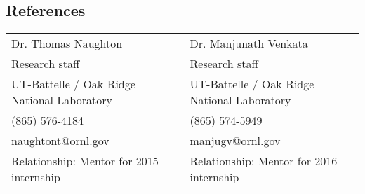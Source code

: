 \documentclass[10pt]{res}
\begin{document}
\begin{resume}
\section{References}
\vspace{2mm}
\begin{tabularx}{\textwidth}{X X}
Dr. Thomas Naughton  & Dr. Manjunath Venkata \\
Research staff & Research staff \\
UT-Battelle / Oak Ridge National Laboratory & UT-Battelle / Oak Ridge National Laboratory \\
(865) 576-4184 & (865) 574-5949 \\
naughtont@ornl.gov & manjugv@ornl.gov \\
Relationship: Mentor for 2015 internship & Relationship: Mentor for 2016 internship
\end{tabularx}
%
\end{resume}
\end{document}
